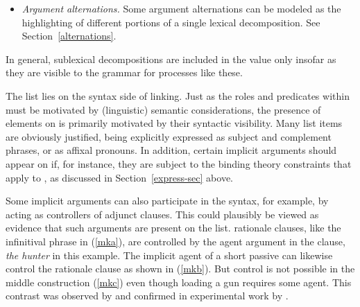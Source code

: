 \documentclass[output=paper
 	        ,biblatex
                ,babelshorthands
                ,newtxmath
                ,draftmode
                ,colorlinks, citecolor=brown
]{langscibook}
\begin{document}
\begin{itemize}
\item \textit{Argument alternations.}  Some argument alternations can be modeled as the highlighting of different portions of a single lexical decomposition.  See Section~\ref{alternations}.
\end{itemize}  

\noindent
In general, sublexical decompositions are included in the \content value only insofar as they are visible to the grammar for processes like these.  

The \argst list lies on the syntax side of linking.  Just as the roles and predicates within \content must be motivated by (linguistic) semantic considerations, the presence of elements on \argst is primarily motivated by their syntactic visibility.  Many \argst list items are obviously justified, being explicitly expressed as subject and complement phrases, or as affixal pronouns.  In addition, certain implicit arguments should appear on \argst if, for instance, they are subject to the binding theory constraints that apply to \argst, as discussed in Section~\ref{express-sec} above.

Some implicit arguments can also participate in the syntax, for example, by acting as controllers of
adjunct clauses.  This could plausibly be viewed as evidence that such arguments are present on the
\argst list.   rationale clauses, like the infinitival phrase in
(\ref{mka}), are controlled by the agent argument in the clause, \textit{the
  hunter} in this example.  The implicit agent of a short passive can likewise control
the rationale clause as shown in (\ref{mkb}).  But control is not possible in the middle
construction (\ref{mkc}) even though loading a gun requires some agent.  This contrast was observed
by \citet{KeyserandRoeper1984} and confirmed in experimental work by \citet{MaunerandKoenig2000}.

\begin{exe}
\ex\label{mk}
\begin{xlist}
\end{xlist}
\end{exe}
\end{document}
